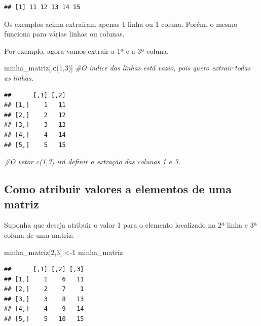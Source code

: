 \documentclass[
]{book}
\newenvironment{Shaded}{\begin{snugshade}}{\end{snugshade}}
\newcommand{\CommentTok}[1]{\textcolor[rgb]{0.56,0.35,0.01}{\textit{#1}}}
\newcommand{\DecValTok}[1]{\textcolor[rgb]{0.00,0.00,0.81}{#1}}
\newcommand{\KeywordTok}[1]{\textcolor[rgb]{0.13,0.29,0.53}{\textbf{#1}}}
\newcommand{\NormalTok}[1]{#1}
\begin{document}
\begin{verbatim}
## [1] 11 12 13 14 15
\end{verbatim}

Os exemplos acima extraíram apenas 1 linha ou 1 coluna. Porém, o mesmo
funciona para várias linhas ou colunas.

Por exemplo, agora vamos extrair a 1ª e a 3ª coluna.

\begin{Shaded}
\begin{Highlighting}[]
\NormalTok{minha_matriz[,}\KeywordTok{c}\NormalTok{(}\DecValTok{1}\NormalTok{,}\DecValTok{3}\NormalTok{)] }\CommentTok{#O índice das linhas está vazio, pois quero extrair todas as linhas.}
\end{Highlighting}
\end{Shaded}

\begin{verbatim}
##      [,1] [,2]
## [1,]    1   11
## [2,]    2   12
## [3,]    3   13
## [4,]    4   14
## [5,]    5   15
\end{verbatim}

\begin{Shaded}
\begin{Highlighting}[]
                      \CommentTok{#O vetor c(1,3) irá definir a extração das colunas 1 e 3. }
\end{Highlighting}
\end{Shaded}

\hypertarget{como-atribuir-valores-a-elementos-de-uma-matriz}{%
\subsection{Como atribuir valores a elementos de uma
matriz}\label{como-atribuir-valores-a-elementos-de-uma-matriz}}

Suponha que deseja atribuir o valor 1 para o elemento localizado na 2ª
linha e 3ª coluna de uma matriz:

\begin{Shaded}
\begin{Highlighting}[]
\NormalTok{minha_matriz[}\DecValTok{2}\NormalTok{,}\DecValTok{3}\NormalTok{] <-}\DecValTok{1}
\NormalTok{minha_matriz}
\end{Highlighting}
\end{Shaded}

\begin{verbatim}
##      [,1] [,2] [,3]
## [1,]    1    6   11
## [2,]    2    7    1
## [3,]    3    8   13
## [4,]    4    9   14
## [5,]    5   10   15
\end{verbatim}
\end{document}
